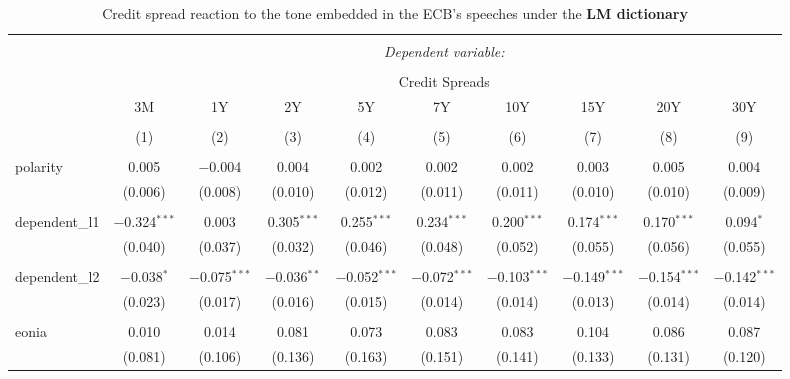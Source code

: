 

\begin{table}[!htbp] \centering 
  \caption[LM Tone \& Credit Spread: all speeches]{Credit spread reaction to the tone embedded in the ECB's speeches under the \textbf{LM dictionary}} 
  \label{tab:spreads_all_lm} 
  \begin{adjustbox}{width=1.25\textwidth}
\begin{tabular}{@{\extracolsep{5pt}}lccccccccc} 
\\[-1.8ex]\hline 
\hline \\[-1.8ex] 
 & \multicolumn{9}{c}{\textit{Dependent variable:}} \\ 
\cline{2-10} 
\\[-1.8ex] & \multicolumn{9}{c}{Credit Spreads} \\ 
 & 3M & 1Y & 2Y & 5Y & 7Y & 10Y & 15Y & 20Y & 30Y \\ 
\\[-1.8ex] & (1) & (2) & (3) & (4) & (5) & (6) & (7) & (8) & (9)\\ 
\hline \\[-1.8ex] 
 polarity & 0.005 & $-$0.004 & 0.004 & 0.002 & 0.002 & 0.002 & 0.003 & 0.005 & 0.004 \\ 
  & (0.006) & (0.008) & (0.010) & (0.012) & (0.011) & (0.011) & (0.010) & (0.010) & (0.009) \\ 
  & & & & & & & & & \\ 
 dependent\_l1 & $-$0.324$^{***}$ & 0.003 & 0.305$^{***}$ & 0.255$^{***}$ & 0.234$^{***}$ & 0.200$^{***}$ & 0.174$^{***}$ & 0.170$^{***}$ & 0.094$^{*}$ \\ 
  & (0.040) & (0.037) & (0.032) & (0.046) & (0.048) & (0.052) & (0.055) & (0.056) & (0.055) \\ 
  & & & & & & & & & \\ 
 dependent\_l2 & $-$0.038$^{*}$ & $-$0.075$^{***}$ & $-$0.036$^{**}$ & $-$0.052$^{***}$ & $-$0.072$^{***}$ & $-$0.103$^{***}$ & $-$0.149$^{***}$ & $-$0.154$^{***}$ & $-$0.142$^{***}$ \\ 
  & (0.023) & (0.017) & (0.016) & (0.015) & (0.014) & (0.014) & (0.013) & (0.014) & (0.014) \\ 
  & & & & & & & & & \\ 
 eonia & 0.010 & 0.014 & 0.081 & 0.073 & 0.083 & 0.083 & 0.104 & 0.086 & 0.087 \\ 
  & (0.081) & (0.106) & (0.136) & (0.163) & (0.151) & (0.141) & (0.133) & (0.131) & (0.120) \\ 

\end{tabular}
\end{adjustbox}
\end{table}
